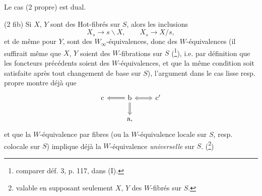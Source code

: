 Le cas (2 propre) est dual.

(2 fib) Si $X$, $Y$ sont des Hot-fibrés sur $S$, alors
les inclusions
\[
X_s \longrightarrow s\backslash X, \qquad X_s \longrightarrow X/s,
\]
et de même pour $Y$, sont des $W_\infty$-équivalences, donc des $W$-équivalences (il suffirait même que $X$, $Y$ soient des $W$-fibrations sur $S$ (\footnote[26]{comparer déf. 3, p. 117, dans (I).}), i.e. par définition que les foncteurs précédents soient des $W$-équivalences, et que la même condition soit satisfaite après tout changement de base sur $S$), l'argument dans le cas lisse resp. propre montre déjà que
\[
\begin{tikzcd}
\text{c} & \text{b} \arrow[l, Rightarrow] \arrow[r, Leftrightarrow] \arrow[d, Rightarrow] & \text{c}' \\
& \text{a,} &
\end{tikzcd}
\]
et que la $W$-équivalence par fibres (ou la $W$-équivalence locale sur $S$, resp. colocale sur $S$) implique déjà la $W$-équivalence \textit{universelle} sur $S$. (\footnote[27]{valable en supposant seulement $X$, $Y$ des $W$-fibrés sur $S$.})

